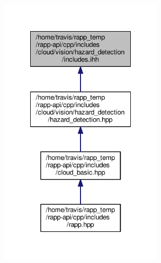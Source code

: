 \begin{figure}[H]
\begin{center}
\leavevmode
\includegraphics[width=228pt]{cloud_2vision_2hazard__detection_2includes_8ihh__dep__incl}
\end{center}
\end{figure}

